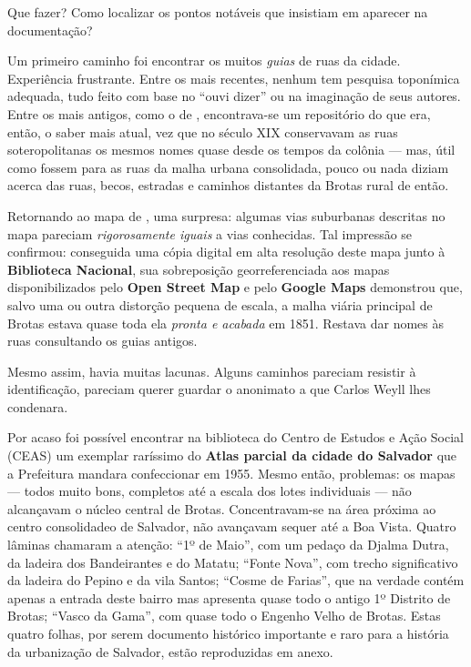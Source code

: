 Que fazer? Como localizar os pontos notáveis que insistiam em aparecer na documentação?

Um primeiro caminho foi encontrar os muitos \textit{guias} de ruas da cidade. Experiência frustrante. Entre os mais recentes, nenhum tem pesquisa toponímica adequada, tudo feito com base no ``ouvi dizer'' ou na imaginação de seus autores. Entre os mais antigos, como o de , encontrava-se um repositório do que era, então, o saber mais atual, vez que no século XIX conservavam as ruas soteropolitanas os mesmos nomes quase desde os tempos da colônia --- mas, útil como fossem para as ruas da malha urbana consolidada, pouco ou nada diziam acerca das ruas, becos, estradas e caminhos distantes da Brotas rural de então.

Retornando ao mapa de , uma surpresa: algumas vias suburbanas descritas no mapa pareciam \textit{rigorosamente iguais} a vias conhecidas. Tal impressão se confirmou: conseguida uma cópia digital em alta resolução deste mapa junto à \textbf{Biblioteca Nacional}, sua sobreposição georreferenciada aos mapas disponibilizados pelo \textbf{Open Street Map} e pelo \textbf{Google Maps} demonstrou que, salvo uma ou outra distorção pequena de escala, a malha viária principal de Brotas estava quase toda ela \textit{pronta e acabada} em 1851. Restava dar nomes às ruas consultando os guias antigos.

Mesmo assim, havia muitas lacunas. Alguns caminhos pareciam resistir à identificação, pareciam querer guardar o anonimato a que Carlos Weyll lhes condenara.

Por acaso foi possível encontrar na biblioteca do Centro de Estudos e Ação Social (CEAS) um exemplar raríssimo do \textbf{Atlas parcial da cidade do Salvador} que a Prefeitura mandara confeccionar em 1955. Mesmo então, problemas: os mapas --- todos muito bons, completos até a escala dos lotes individuais --- não alcançavam o núcleo central de Brotas. Concentravam-se na área próxima ao centro consolidadeo de Salvador, não avançavam sequer até a Boa Vista. Quatro lâminas chamaram a atenção: ``1º de Maio'', com um pedaço da Djalma Dutra, da ladeira dos Bandeirantes e do Matatu; ``Fonte Nova'', com trecho significativo da ladeira do Pepino e da vila Santos; ``Cosme de Farias'', que na verdade contém apenas a entrada deste bairro mas apresenta quase todo o antigo 1º Distrito de Brotas; ``Vasco da Gama'', com quase todo o Engenho Velho de Brotas. Estas quatro folhas, por serem documento histórico importante e raro para a história da urbanização de Salvador, estão reproduzidas em anexo.

